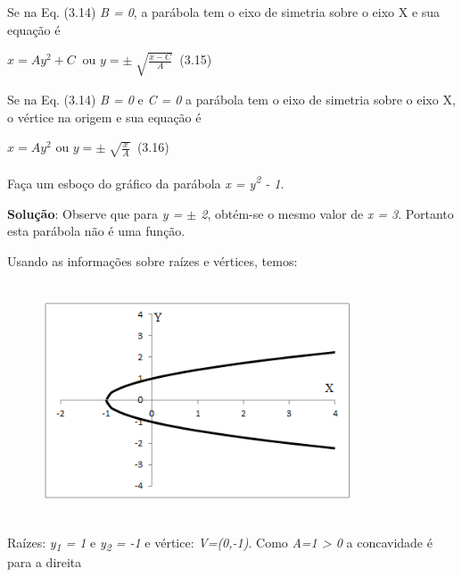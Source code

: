 Se na Eq. (3.14) \textit{B = 0},  a parábola tem o eixo de simetria sobre o eixo X e sua equação é

 \( x=Ay^{2}+C_{~ } \)        ou       \( y= \pm \sqrt[]{\frac{x-C}{A}}_{~ } \)  \tab (3.15)

Se na Eq. (3.14) \textit{B = 0} e \textit{C = 0}   a parábola tem o eixo de simetria sobre o eixo X, o vértice na origem e sua equação é

 \( x=Ay^{2}_{~ } \)        ou       \( y= \pm \sqrt[]{\frac{x}{A}}_{~ } \)  \tab (3.16)

\begin{texemplo}
Faça um esboço do gráfico da parábola \textit{ x = y\textsuperscript{2} - 1}. 

\textbf{Solução}: Observe que para \textit{y = $ \pm $  2}, obtém-se o mesmo valor de \textit{x = 3}.  Portanto esta parábola não é uma função.

Usando as informações sobre raízes e vértices, temos:

\begin{figure}[H]
	\begin{Center}
		\includegraphics[width=3.62in,height=2.74in]{capitulos/funcao_do_segundo_grau/media/image10.png}
	\end{Center}
\end{figure}

Raízes: \textit{y\textsubscript{1} = 1}   e  \textit{y\textsubscript{2} = -1}   e   vértice: \textit{V=(0,-1)}. Como \textit{A=1 > 0} a concavidade é para a direita \qedsymbol{}
\end{texemplo}

